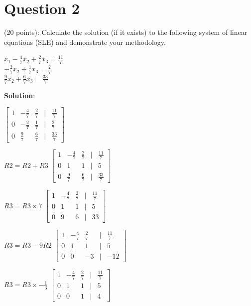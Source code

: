 \documentclass{article}
\begin{document}
%
\vfill\break
\section*{Question 2} (20 points): Calculate the solution (if it exists) to the following system of linear equations (SLE) and demonstrate your methodology.

\noindent
$x_1 - \frac{4}{7}x_2 + \frac{2}{7}x_3 = \frac{11}{7}$ \\
$-\frac{2}{7}x_2 + \frac{1}{7}x_3 = \frac{2}{7}$ \\
$\frac{9}{7}x_2 + \frac{6}{7}x_3 = \frac{33}{7}$

\noindent
\textbf{Solution}:

$\begin{bmatrix}
1 & -\frac{4}{7} & \frac{2}{7} & | & \frac{11}{7} \\
0 & -\frac{2}{7} & \frac{1}{7} & | & \frac{2}{7} \\
0 & \frac{9}{7} & \frac{6}{7} & | & \frac{33}{7}
\end{bmatrix}$

\noindent
$R2 = R2 + R3$
$\begin{bmatrix}
1 & -\frac{4}{7} & \frac{2}{7} & | & \frac{11}{7} \\
0 & 1            & 1           & | & 5 \\
0 & \frac{9}{7}  & \frac{6}{7} & | & \frac{33}{7}
\end{bmatrix}$

\noindent
$R3 = R3 \times 7$
$\begin{bmatrix}
1 & -\frac{4}{7} & \frac{2}{7} & | & \frac{11}{7} \\
0 & 1            & 1           & | & 5 \\
0 & 9            & 6           & | & 33
\end{bmatrix}$

\noindent
$R3 = R3 - 9R2$
$\begin{bmatrix}
1 & -\frac{4}{7} & \frac{2}{7} & | & \frac{11}{7} \\
0 & 1            & 1           & | & 5 \\
0 & 0            & -3          & | & -12
\end{bmatrix}$

\noindent
$R3 = R3 \times -\frac{1}{3}$
$\begin{bmatrix}
1 & -\frac{4}{7} & \frac{2}{7} & | & \frac{11}{7} \\
0 & 1            & 1           & | & 5 \\
0 & 0            & 1           & | & 4
\end{bmatrix}$
\end{document}
